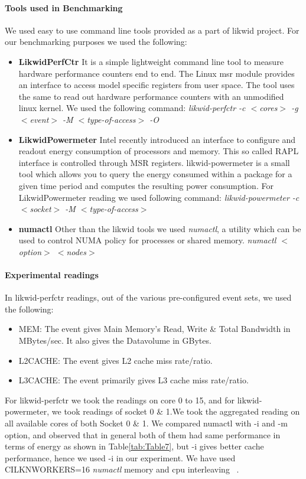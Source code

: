 \paragraph{Tools used in Benchmarking}
We used easy to use command line tools provided as a part of likwid
project. For our benchmarking purposes we used the following:
\begin{itemize}[leftmargin=*]
\item \textbf{LikwidPerfCtr}
It is a simple lightweight command line tool to measure hardware 
performance counters end to end. The Linux msr module provides
an interface to access model specific registers from user space.
The tool uses the same to read out hardware
performance counters with an unmodified linux kernel. We used the 
following command:\newline
\emph{likwid-perfctr -c $<$cores$>$ -g $<$event$>$ -M $<$type-of-access$>$ -O}
\item \textbf{LikwidPowermeter}
Intel recently introduced an interface to configure and readout 
energy consumption of processors and memory. This so called RAPL 
interface is controlled through MSR registers. likwid-powermeter 
is a small tool which allows you to query the energy consumed within 
a package for a given time period and computes the resulting power 
consumption. For LikwidPowermeter reading we used following command:\newline
\emph{likwid-powermeter -c $<$socket$>$ -M $<$type-of-access$>$}\newline
\item \textbf{numactl}
Other than the likwid tools we used \emph{numactl}, a utility which can be 
used to control NUMA policy for processes or shared memory.
\emph{numactl $<$option$>$ $<$nodes$>$}
\end{itemize}

\paragraph{Experimental readings}
In likwid-perfctr readings, out of the various pre-configured event sets, we 
used the following:
\begin{itemize}[leftmargin=*]
\item MEM: The event gives Main Memory's Read, Write \& Total 
Bandwidth in MBytes/sec. It also gives the Datavolume in GBytes.
\item L2CACHE: The event gives L2 cache miss rate/ratio.
\item L3CACHE: The event primarily gives L3 cache miss rate/ratio.
\end{itemize}
For likwid-perfctr we took the readings on core 0 to 15, and for
likwid-powermeter, we took readings of socket 0 \& 1.\newline We took
the aggregated reading on all available cores of both Socket 0 \& 1.
We compared numactl with -i and -m option, and observed that in
general both of them had same performance in terms of energy as shown
in Table\ref{tab:Table7}, but -i gives better cache performance, hence we
used -i in our experiment.  We have used CILKNWORKERS=16
\emph{numactl} memory and cpu interleaving ~\cite{NUMA-MAN}.

